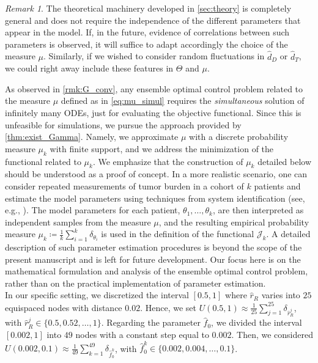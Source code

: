 \documentclass[a4paper,12pt, reqno]{amsart}
\theoremstyle{plain}
\theoremstyle{definition}
\theoremstyle{remark}
\newtheorem{remark}{Remark}
\numberwithin{equation}{section}
\newcommand{\J}{\mathcal{J}}
\begin{document}
\begin{remark} \label{rmk:indep_meas}
    The theoretical machinery developed in \cref{sec:theory} is completely general and does not require the independence of the different parameters that appear in the model.
    If, in the future, evidence of correlations between such parameters is observed, it will suffice to adapt accordingly the choice of the measure $\mu$.
    Similarly, if we wished to consider random fluctuations in $\hat d_D$ or $\hat d_T$, we could right away include these features in $\Theta$ and $\mu$.
\end{remark}

As observed in \cref{rmk:G_conv}, any ensemble optimal control problem related to the measure $\mu$ defined as in \cref{eq:mu_simul} requires the \emph{simultaneous} solution of infinitely many ODEs, just for evaluating the objective functional. 
Since this is unfeasible for simulations, we pursue the approach provided by \cref{thm:exist_Gamma}. Namely, we approximate $\mu$ with a discrete probability measure $\mu_k$ with finite support, and we address the minimization of the functional related to $\mu_k$.
{We emphasize that the construction of $\mu_k$ detailed below should be understood as a proof of concept. In a more realistic scenario, one can consider repeated measurements of tumor burden in a cohort of $k$ patients and estimate the model parameters using techniques from system identification (see, e.g., \cite{Nelles2020}). The model parameters for each patient, $\theta_1,\ldots,\theta_k$, are then interpreted as independent samples from the measure $\mu$, and the resulting empirical probability measure $
\mu_k \coloneqq \frac1k \sum_{i=1}^k \delta_{\theta_i}$
is used in the definition of the functional $\J_k$. 
A detailed description of such parameter estimation procedures is beyond the scope of the present manuscript and is left for future development. Our focus here is on the mathematical formulation and analysis of the ensemble optimal control problem, rather than on the practical implementation of parameter estimation.}\\
In our specific setting, we discretized the interval $[0.5,1]$ where $\hat r_R$ varies into $25$ equi\-spaced nodes with distance $0.02$. Hence, we set $U(0.5,1)\approx \frac{1}{25}\sum_{j=1}^{25} \delta_{\hat r_R^j}$, with $\hat r_R^j\in \{0.5, 0.52,\ldots,1\}$.
Regarding the parameter $\hat f_0$, we divided the interval $[0.002,1]$ into $49$ nodes with a constant step equal to $0.002$. Then, we considered $U(0.002,0.1)\approx \frac{1}{49}\sum_{k=1}^{49} \delta_{\hat f_0^k}$, with $\hat f_0^k\in \{0.002, 0.004,\ldots,0.1\}$.
\end{document}
